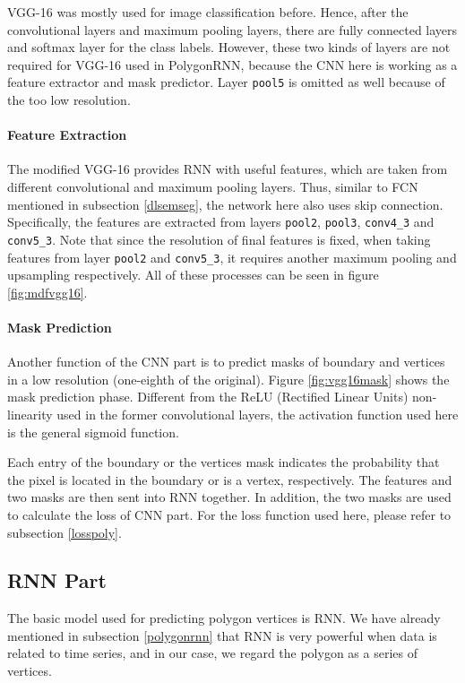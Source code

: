 

VGG-16 was mostly used for image classification before. Hence, after the convolutional layers and maximum pooling layers, there are fully connected layers and softmax layer for the class labels. However, these two kinds of layers are not required for VGG-16 used in PolygonRNN, because the CNN here is working as a feature extractor and mask predictor. Layer \lstinline{pool5} is omitted as well because of the too low resolution.

\paragraph{Feature Extraction} The modified VGG-16 provides RNN with useful features, which are taken from different convolutional and maximum pooling layers. Thus, similar to FCN mentioned in subsection \ref{dlsemseg}, the network here also uses skip connection. Specifically, the features are extracted from layers \lstinline{pool2}, \lstinline{pool3}, \lstinline{conv4_3} and \lstinline{conv5_3}. Note that since the resolution of final features is fixed, when taking features from layer \lstinline{pool2} and \lstinline{conv5_3}, it requires another maximum pooling and upsampling respectively. All of these processes can be seen in figure \ref{fig:mdfvgg16}.



\paragraph{Mask Prediction}
Another function of the CNN part is to predict masks of boundary and vertices in a low resolution (one-eighth of the original). Figure \ref{fig:vgg16mask} shows the mask prediction phase. Different from the ReLU (Rectified Linear Units) \cite{relu} non-linearity used in the former convolutional layers, the activation function used here is the general sigmoid function.



Each entry of the boundary or the vertices mask indicates the probability that the pixel is located in the boundary or is a vertex, respectively. The features and two masks are then sent into RNN together. In addition, the two masks are used to calculate the loss of CNN part. For the loss function used here, please refer to subsection \ref{losspoly}.

\subsection{RNN Part}\label{modrnn}
The basic model used for predicting polygon vertices is RNN. We have already mentioned in subsection \ref{polygonrnn} that RNN is very powerful when data is related to time series, and in our case, we regard the polygon as a series of vertices.

